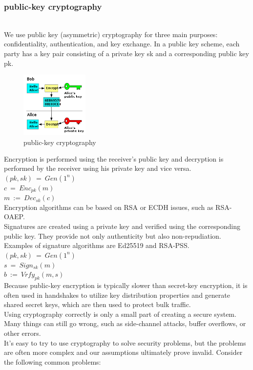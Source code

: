 \subsubsection{public-key cryptography}\cite{b38}
\\
We use public key (asymmetric) cryptography for three main purposes: confidentiality, 
authentication, and key exchange. In a public key scheme, each party has a key pair 
consisting of a private key sk and a corresponding public key pk.
\begin{figure}[H] %
    \centering %
    \includegraphics[width=0.3\textwidth]{figures/public_key.png} %
    \caption{public-key cryptography} %
    \label{Fig.2: public-key cryptography} %
\end{figure}
Encryption is performed using the receiver's public key and decryption is performed 
by the receiver using his private key and vice versa.
\\
$(pk, sk) \ = \ Gen(1^n)$
\\
$c \ = \ Enc_{pk}(m)$
\\
$m \ := \ Dec_{sk}(c)$
\\
Encryption algorithms can be based on RSA or ECDH issues, such as RSA-OAEP.
\\
Signatures are created using a private key and verified using the corresponding public key. 
They provide not only authenticity but also non-repudiation. Examples of signature algorithms 
are Ed25519 and RSA-PSS.
\\
$(pk, sk) \ = \ Gen(1^n)$
\\
$s \ = \ Sign_{sk}(m)$
\\
$b \ := \ Vrfy_{pk}(m, s)$
\\
Because public-key encryption is typically slower than secret-key encryption, it is often 
used in handshakes to utilize key distribution properties and generate shared secret keys, 
which are then used to protect bulk traffic.
\\
Using cryptography correctly is only a small part of creating a secure system. Many things 
can still go wrong, such as side-channel attacks, buffer overflows, or other errors.
\\
It's easy to try to use cryptography to solve security problems, but the problems are often 
more complex and our assumptions ultimately prove invalid. Consider the following common problems:

